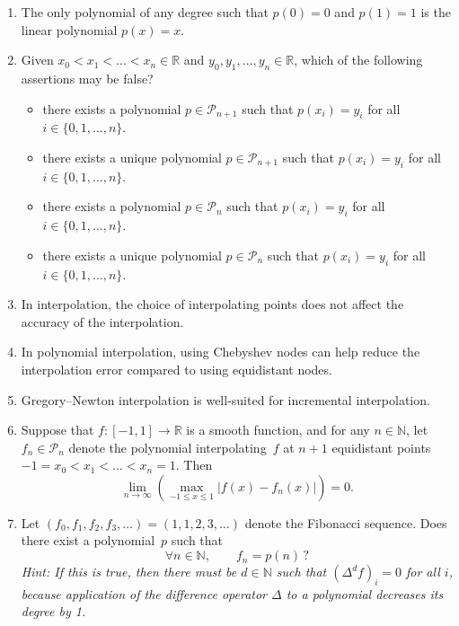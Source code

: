 \documentclass{article}
\begin{document}
\begin{enumerate}

    \item
        The only polynomial of any degree such that $p(0) = 0$ and $p(1) = 1$ is the linear polynomial $p(x) = x$.

    \item
        Given $x_0 < x_1 < \dotsc < x_n \in \mathbb R$
        and $y_0, y_1, \dotsc , y_n \in \mathbb R$,
        which of the following assertions may be false?
        \begin{itemize}[label=$\circ$]
            \item
                there exists a polynomial $p \in \mathcal P_{n+1}$ such that $p(x_i) = y_i$ for all $i \in \{0, 1, \dotsc, n\}$.
            \item
                there exists a unique polynomial $p \in \mathcal P_{n+1}$ such that $p(x_i) = y_i$ for all $i \in \{0, 1, \dotsc, n\}$.
            \item
                there exists a polynomial $p \in \mathcal P_{n}$ such that $p(x_i) = y_i$ for all $i \in \{0, 1, \dotsc, n\}$.
            \item
                there exists a unique polynomial $p \in \mathcal P_{n}$ such that $p(x_i) = y_i$ for all $i \in \{0, 1, \dotsc, n\}$.
        \end{itemize}

    \item
        In interpolation, the choice of interpolating points does not affect the accuracy of the interpolation.

    \item
        In polynomial interpolation, using Chebyshev nodes can help reduce the interpolation error compared to using equidistant nodes.

    \item
        Gregory--Newton interpolation is well-suited for incremental interpolation.

    \item
        Suppose that $f \colon [-1, 1] \to \mathbb R$ is a smooth function,
        and for any $n \in \mathbb N$,
        let $f_n \in \mathcal P_n$ denote the polynomial interpolating~$f$ at $n+1$ equidistant points $-1 = x_0 < x_1 < \dotsc < x_n = 1$.
        Then
        \[
            \lim_{n \to \infty} \left( \max_{-1 \leq x \leq 1} \bigl\lvert f(x) - f_n(x) \bigr\rvert \right) = 0.
        \]

    \item
        Let $(f_0, f_1, f_2, f_3, \dotsc) = (1, 1, 2, 3, \dotsc)$ denote the Fibonacci sequence.
        Does there exist a polynomial~$p$ such that
        \[
            \forall n \in \mathbb N, \qquad
            f_n = p(n) \, ?
        \]
        \emph{%
            Hint: If this is true, then there must be $d \in \mathbb N$ such that $(\Delta^d f)_i = 0$ for all $i$,
            because application of the difference operator $\Delta$ to a polynomial decreases its degree by 1.
        }


\end{enumerate}
\end{document}
